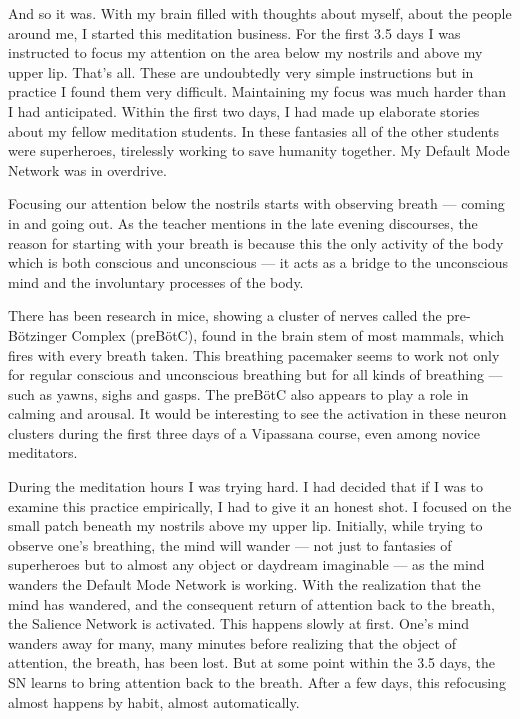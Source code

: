 \documentclass[a4paper, amsfonts, amssymb, amsmath, reprint, showkeys, nofootinbib, twoside]{revtex4-1}
\begin{document}
And so it was. With my brain filled with thoughts about myself, about the people
around me, I started this meditation business. For the first 3.5 days I was instructed
to focus my attention on the area below my nostrils and above my upper
lip. That's all. These are undoubtedly very simple instructions but in practice I
found them very difficult. Maintaining my focus was much harder than I had
anticipated. Within the first two days, I had made up elaborate stories about my
fellow meditation students. In these fantasies all of the other students were
superheroes, tirelessly working to save humanity together. My Default Mode Network
was in overdrive.

Focusing our attention below the nostrils starts with observing breath --- coming in
and going out. As the teacher mentions in the late evening discourses, the reason for
starting with your breath is because this the only activity of the body which is both
conscious and unconscious --- it acts as a bridge to the unconscious mind and the
involuntary processes of the body.

There has been research in mice, showing a cluster of nerves called the
pre-Bötzinger Complex (preBötC), found in the brain stem of most mammals, which fires
with every breath taken. This breathing pacemaker seems to work not only for regular
conscious and unconscious breathing but for all kinds of breathing --- such as yawns,
sighs and gasps. The preBötC also appears to play a role in calming and
arousal. \cite{prebotcgeneration} It would be interesting to see the activation in
these neuron clusters during the first three days of a Vipassana course, even among
novice meditators.

During the meditation hours I was trying hard. I had decided that if I was to examine this practice
empirically, I had to give it an honest shot. I focused on the small patch beneath my
nostrils above my upper lip. Initially, while trying to observe one's breathing, the
mind will wander --- not just to fantasies of superheroes but to almost any object or
daydream imaginable --- as the mind wanders the Default Mode Network is working. With
the realization that the mind has wandered, and the consequent return of attention
back to the breath, the Salience Network is activated. 
This happens slowly at first. One's mind wanders away for many, many minutes before 
realizing that the object of attention, the breath, has been lost. But
at some point within the 3.5 days, the SN learns to bring attention back to the breath. After a few days, this
refocusing almost happens by habit, almost automatically.
\end{document}
